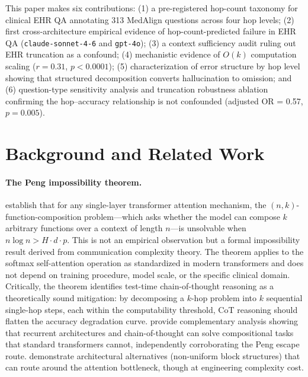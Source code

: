 \documentclass{article}
\begin{document}
This paper makes six contributions: (1) a pre-registered hop-count taxonomy for clinical EHR QA annotating 313 MedAlign questions across four hop levels; (2) first cross-architecture empirical evidence of hop-count-predicted failure in EHR QA (\texttt{claude-sonnet-4-6} and \texttt{gpt-4o}); (3) a context sufficiency audit ruling out EHR truncation as a confound; (4) mechanistic evidence of $O(k)$ computation scaling ($r = 0.31$, $p < 0.0001$); (5) characterization of error structure by hop level showing that structured decomposition converts hallucination to omission; and (6) question-type sensitivity analysis and truncation robustness ablation confirming the hop--accuracy relationship is not confounded (adjusted OR = 0.57, $p = 0.005$).

\section{Background and Related Work}

\paragraph{The Peng impossibility theorem.}
\citet{peng2024limitations} establish that for any single-layer transformer
attention mechanism, the $(n, k)$-function-composition problem---which asks
whether the model can compose $k$ arbitrary functions over a context of length
$n$---is unsolvable when $n \log n > H \cdot d \cdot p$.
This is not an empirical observation but a formal impossibility result derived
from communication complexity theory. The theorem applies to the softmax
self-attention operation as standardized in modern transformers and does not
depend on training procedure, model scale, or the specific clinical domain.
Critically, the theorem identifies test-time chain-of-thought reasoning as a
theoretically sound mitigation: by decomposing a $k$-hop problem into $k$
sequential single-hop steps, each within the computability threshold,
CoT reasoning should flatten the accuracy degradation curve.
\citet{yehudai2025compositional} provide complementary analysis showing that
recurrent architectures and chain-of-thought can solve compositional tasks
that standard transformers cannot, independently corroborating the Peng
escape route. \citet{zhou2023brainformers} demonstrate architectural
alternatives (non-uniform block structures) that can route around the
attention bottleneck, though at engineering complexity cost.
\end{document}
